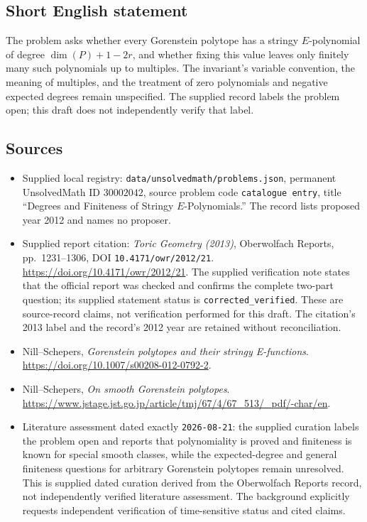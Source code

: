 \documentclass[11pt]{article}
\begin{document}
\subsection{Short English statement}
The problem asks whether every Gorenstein polytope has a stringy \(E\)-polynomial of degree \(\dim(P)+1-2r\), and whether fixing this value leaves only finitely many such polynomials up to multiples. The invariant's variable convention, the meaning of multiples, and the treatment of zero polynomials and negative expected degrees remain unspecified. The supplied record labels the problem open; this draft does not independently verify that label.
\subsection{Sources}
\begin{itemize}
\item Supplied local registry: \texttt{data/unsolvedmath/problems.json}, permanent UnsolvedMath ID \(30002042\), source problem code \texttt{catalogue entry}, title ``Degrees and Finiteness of Stringy \(E\)-Polynomials.'' The record lists proposed year 2012 and names no proposer.
\item Supplied report citation: \emph{Toric Geometry (2013)}, Oberwolfach Reports, pp.\ 1231--1306, DOI \texttt{10.4171/owr/2012/21}. \url{https://doi.org/10.4171/owr/2012/21}. The supplied verification note states that the official report was checked and confirms the complete two-part question; its supplied statement status is \texttt{corrected\_verified}. These are source-record claims, not verification performed for this draft. The citation's 2013 label and the record's 2012 year are retained without reconciliation.
\item Nill--Schepers, \emph{Gorenstein polytopes and their stringy E-functions}. \url{https://doi.org/10.1007/s00208-012-0792-2}.
\item Nill--Schepers, \emph{On smooth Gorenstein polytopes}. \url{https://www.jstage.jst.go.jp/article/tmj/67/4/67_513/_pdf/-char/en}.
\item Literature assessment dated exactly \texttt{2026-08-21}: the supplied curation labels the problem open and reports that polynomiality is proved and finiteness is known for special smooth classes, while the expected-degree and general finiteness questions for arbitrary Gorenstein polytopes remain unresolved. This is supplied dated curation derived from the Oberwolfach Reports record, not independently verified literature assessment. The background explicitly requests independent verification of time-sensitive status and cited claims.
\end{itemize}
\end{document}
